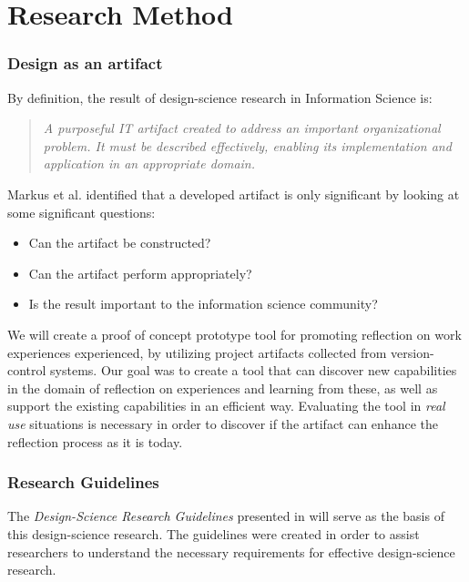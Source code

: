 %
\section{Research Method}
\subsubsection{Design as an artifact}
By definition, the result of design-science research in Information Science is:
\begin{quote}
\emph{A purposeful IT artifact created to address an important organizational problem. It must be described effectively, enabling its implementation and application in an appropriate domain.} \citep{Esearch2004}
\end{quote}
Markus et al.\citep{markusetal} identified that a developed artifact is only significant by looking at some significant questions: 
\begin{itemize}
\item Can the artifact be constructed?
\item Can the artifact perform appropriately?
\item Is the result important to the information science community?
\end{itemize}
We will create a proof of concept prototype tool for promoting reflection on work experiences experienced, by utilizing project artifacts collected from version-control systems. Our goal was to create a tool that can discover new capabilities in the domain of reflection on experiences and learning from these, as well as support the existing capabilities in an efficient way. Evaluating the tool in \emph{real use} situations is necessary in order to discover if the artifact can enhance the reflection process as it is today.

\subsubsection{Research Guidelines}
The \emph{Design-Science Research Guidelines} presented in \citep{Esearch2004} will serve as the basis of this design-science research. The guidelines were created in order to assist researchers to understand the necessary requirements for effective design-science research. 

